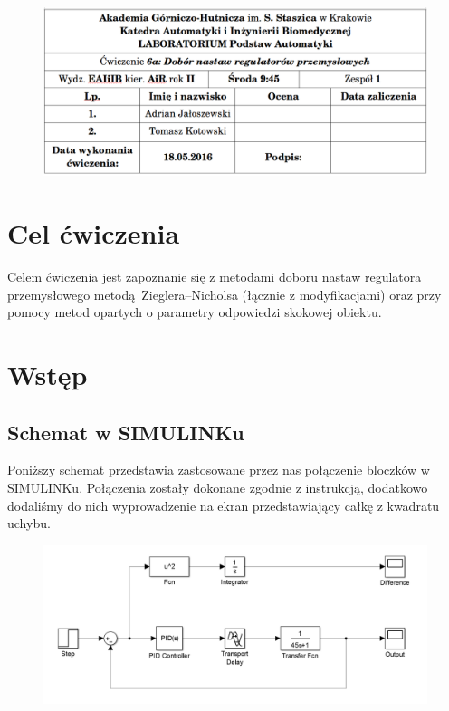 \documentclass[a4paper, 12pt]{article}
\begin{document}
	\begin{figure}[H]
		\centering
		\includegraphics[width = \textwidth]{./img/cudo.png}
	\end{figure}
	\section{Cel ćwiczenia}
		Celem ćwiczenia jest zapoznanie się z metodami doboru nastaw regulatora przemysłowego metodą Zieglera--Nicholsa (łącznie z modyfikacjami) oraz przy pomocy metod opartych o parametry odpowiedzi skokowej obiektu.
	\section{Wstęp}
		\subsection{Schemat w SIMULINKu}
			Poniższy schemat przedstawia zastosowane przez nas połączenie bloczków w SIMULINKu. Połączenia zostały dokonane zgodnie z instrukcją, dodatkowo dodaliśmy do nich wyprowadzenie na ekran przedstawiający całkę z kwadratu uchybu.
			\begin{figure}[H]
				\centering
				\includegraphics[width = \textwidth]{./img/schemat.png}
			\end{figure}
\end{document}
